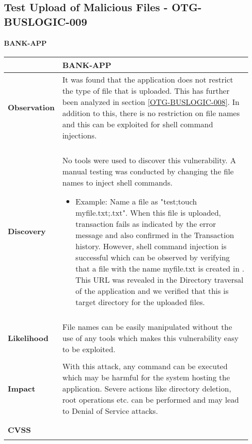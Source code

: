\subsection{Test Upload of Malicious Files - OTG-BUSLOGIC-009}
\paragraph{BANK-APP} \mbox{}
\begin{longtable*}{p{.30\textwidth} | p{.70\textwidth}}
    \hline
    & \textbf{BANK-APP} \\
    \hline
    \textbf{Observation} &
      It was found that the application does not restrict the type of file that is uploaded. This has further been analyzed in section \ref{OTG-BUSLOGIC-008}. In addition to this, there is no restriction on file names and this can be exploited for shell command injections.
    \\\\
    \textbf{Discovery} &
        No tools were used to discover this vulnerability. A manual testing was conducted by changing the file names to inject shell commands.
        \begin{itemize}
        \item Example:
                Name a file as "test;touch myfile.txt;.txt".
                When this file is uploaded, transaction fails as indicated by the error message and also confirmed in the Transaction history. However, shell command injection is successful which can be observed by verifying that a file with the name myfile.txt is created in
                .
                This URL was revealed in the Directory traversal of the application and we verified that this is target directory for the uploaded files.
        \end{itemize}
    \\\\
    \textbf{Likelihood} &
	File names can be easily manipulated without the use of any tools which makes this vulnerability easy to be exploited.
    \\\\
    \textbf{Impact} &
       With this attack, any command can be executed which may be harmful for the system hosting the application. Severe actions like directory deletion, root operations etc. can be performed and may lead to Denial of Service attacks.
    \\\\
    \textbf{CVSS} &
      \begin{tabular}{| l | l |}

\end{tabular}
\end{longtable*}
